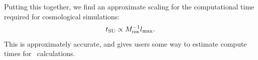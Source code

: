 Putting this together, we find an approximate scaling for the
computational time required for cosmological simulations:
\begin{equation}
t_{\rm SU} \propto M_{\rm res}^{-1} l_{\rm max}.
\end{equation}
This is approximately accurate, and gives users some way to estimate
compute times for \enzo\ calculations.  
